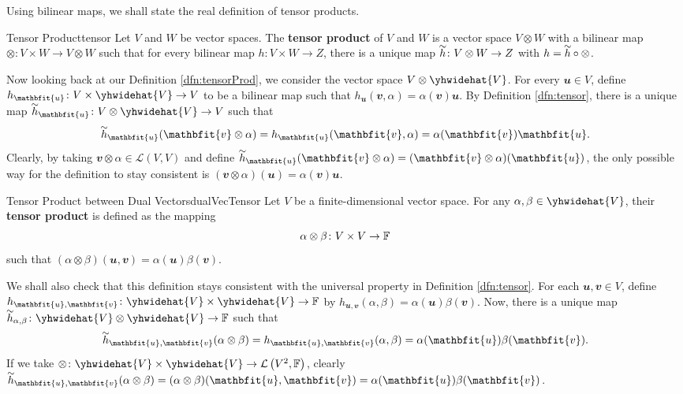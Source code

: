 \documentclass[math, code]{amznotes}
\renewcommand\widetilde[1]{\ThisStyle{%
  \setbox0=\hbox{$\SavedStyle#1$}%
  \stackengine{1pt-\LMpt}{$\SavedStyle#1$}{%
    \stretchto{\scaleto{\SavedStyle\mkern.2mu\sim}{.5467\wd0}}{.5\ht0}%
  }{O}{c}{F}{T}{S}%
}}
\theoremstyle{remark}
\begin{document}
Using bilinear maps, we shall state the real definition of tensor products.
\begin{dfnbox}{Tensor Product}{tensor}
    Let $V$ and $W$ be vector spaces. The {\color{red} \textbf{tensor product}} of $V$ and $W$ is a vector space $V \otimes W$ with a bilinear map $\otimes \colon V \times W \to V \otimes W$ such that for every bilinear map $h \colon V \times W \to Z$, there is a unique map $\widetilde{h} \colon V \otimes W \to Z$ with $h = \widetilde{h} \circ \otimes$.
\end{dfnbox}
Now looking back at our Definition \ref{dfn:tensorProd}, we consider the vector space $V \otimes \yhwidehat{V}$. For every $\mathbfit{u} \in V$, define $h_{\mathbfit{u}} \colon V \times \yhwidehat{V} \to V$ to be a bilinear map such that $h_{\mathbfit{u}}(\mathbfit{v}, \alpha) = \alpha(\mathbfit{v})\mathbfit{u}$. By Definition \ref{dfn:tensor}, there is a unique map $\widetilde{h}_{\mathbfit{u}} \colon V \otimes \yhwidehat{V} \to V$ such that 
\begin{equation*}
    \widetilde{h}_{\mathbfit{u}}(\mathbfit{v} \otimes \alpha) = h_{\mathbfit{u}}(\mathbfit{v}, \alpha) = \alpha(\mathbfit{v})\mathbfit{u}.
\end{equation*}
Clearly, by taking $\mathbfit{v} \otimes \alpha \in \mathcal{L}(V, V)$ and define $\widetilde{h}_{\mathbfit{u}}(\mathbfit{v} \otimes \alpha) = (\mathbfit{v} \otimes \alpha)(\mathbfit{u})$, the only possible way for the definition to stay consistent is $(\mathbfit{v} \otimes \alpha)(\mathbfit{u}) = \alpha(\mathbfit{v})\mathbfit{u}$.
\begin{dfnbox}{Tensor Product between Dual Vectors}{dualVecTensor}
    Let $V$ be a finite-dimensional vector space. For any $\alpha, \beta \in \yhwidehat{V}$, their {\color{red} \textbf{tensor product}} is defined as the mapping 
    \begin{equation*}
        \alpha \otimes \beta \colon V \times V \to \mathbb{F}
    \end{equation*}
    such that $(\alpha \otimes \beta)(\mathbfit{u}, \mathbfit{v}) = \alpha(\mathbfit{u})\beta(\mathbfit{v})$.
\end{dfnbox}
We shall also check that this definition stays consistent with the universal property in Definition \ref{dfn:tensor}. For each $\mathbfit{u}, \mathbfit{v} \in V$, define $h_{\mathbfit{u}, \mathbfit{v}} \colon \yhwidehat{V} \times \yhwidehat{V} \to \F$ by $h_{\mathbfit{u}, \mathbfit{v}}(\alpha, \beta) = \alpha(\mathbfit{u})\beta(\mathbfit{v})$. Now, there is a unique map $\widetilde{h}_{\alpha, \beta} \colon \yhwidehat{V} \otimes \yhwidehat{V} \to \F$ such that 
\begin{equation*}
    \widetilde{h}_{\mathbfit{u}, \mathbfit{v}}(\alpha \otimes \beta) = h_{\mathbfit{u}, \mathbfit{v}}(\alpha, \beta) = \alpha(\mathbfit{u})\beta(\mathbfit{v}).
\end{equation*}
If we take $\otimes \colon \yhwidehat{V} \times \yhwidehat{V} \to \mathcal{L}\left(V^2, \F\right)$, clearly $\widetilde{h}_{\mathbfit{u}, \mathbfit{v}}(\alpha \otimes \beta) = (\alpha \otimes \beta)(\mathbfit{u}, \mathbfit{v}) = \alpha(\mathbfit{u})\beta(\mathbfit{v})$.
\end{document}

